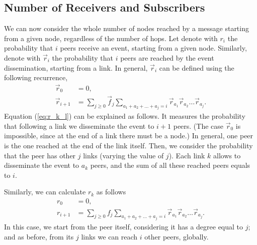 \documentclass[10pt, conference, compsocconf]{IEEEtran}
\begin{document}
\subsection{Number of Receivers and Subscribers}

We can now consider the whole number of nodes reached by a message starting from a given node, regardless of the number of hops. Let denote with $r_i$ the probability that $i$ peers receive an event, starting from a given node. Similarly, denote with $\overrightarrow{r}_i$ the probability that $i$ peers are reached by the event dissemination, starting from a link. In general, $\overrightarrow{r}_i$ can be defined using the following recurrence,
\begin{align}\label{eq:r_k_l}
  \overrightarrow{r}_0 & =  0,\nonumber \\
  \overrightarrow{r}_{i+1} & =  \sum_{j \geq 0} \overrightarrow{f}_j \sum_{a_1 + a_2 + \ldots + a_j = i} \overrightarrow{r}_{a_1} \overrightarrow{r}_{a_2} \ldots \overrightarrow{r}_{a_j}.
\end{align}
Equation (\ref{eq:r_k_l}) can be explained as follows. It measures the probability that following a link we disseminate the event to $i+1$ peers. (The case $\overrightarrow{r}_0$ is impossible, since at the end of a link there must be a node.) In general, one peer is the one reached at the end of the link itself. Then, we consider the probability that the peer has other $j$ links (varying the value of $j$). Each link $k$ allows to disseminate the event to $a_k$ peers, and the sum of all these reached peers equals to $i$.

Similarly, we can calculate $r_k$ as follows
\begin{align}\label{eq:r_k}
  r_0  &= 0,\nonumber \\
  r_{i+1}  &= \sum_{j \geq 0} f_j \sum_{a_1 + a_2 + \ldots + a_j = i} \overrightarrow{r}_{a_1} \overrightarrow{r}_{a_2} \ldots \overrightarrow{r}_{a_j}.
\end{align}
In this case, we start from the peer itself, considering it has a degree equal to $j$; and as before, from its $j$ links we can reach $i$ other peers, globally.
\end{document}
